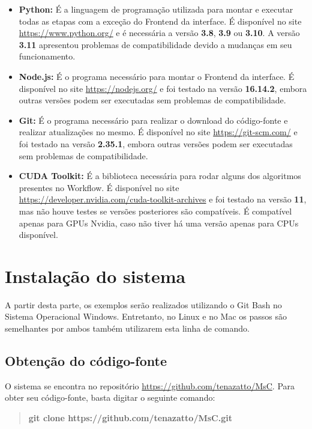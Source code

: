 \documentclass[portugues]{ic-tese}
\begin{document}
\begin{itemize}
    \item {\textbf{Python:}} É a linguagem de programação utilizada para montar e executar todas as etapas com a exceção do Frontend da interface. É disponível no site \url{https://www.python.org/} e é necessária a versão \textbf{3.8}, \textbf{3.9} ou \textbf{3.10}. A versão \textbf{3.11} apresentou problemas de compatibilidade devido a mudanças em seu funcionamento.
    \item {\textbf{Node.js:}} É o programa necessário para montar o Frontend da interface. É disponível no site \url{https://nodejs.org/} e foi testado na versão \textbf{16.14.2}, embora outras versões podem ser executadas sem problemas de compatibilidade.
    \item {\textbf{Git:}} É o programa necessário para realizar o download do código-fonte e realizar atualizações no mesmo. É disponível no site \url{https://git-scm.com/} e foi testado na versão \textbf{2.35.1}, embora outras versões podem ser executadas sem problemas de compatibilidade.
	\item {\textbf{CUDA Toolkit:}} É a biblioteca necessária para rodar alguns dos algoritmos presentes no Workflow. É disponível no site \url{https://developer.nvidia.com/cuda-toolkit-archives} e foi testado na versão \textbf{11}, mas não houve testes se versões posteriores são compatíveis. É compatível apenas para GPUs Nvidia, caso não tiver há uma versão apenas para CPUs disponível.
\end{itemize}

\section{Instalação do sistema}

A partir desta parte, os exemplos serão realizados utilizando o Git Bash no Sistema Operacional Windows. Entretanto, no Linux e no Mac os passos são semelhantes por ambos também utilizarem esta linha de comando.

\subsection{Obtenção do código-fonte}

O sistema se encontra no repositório \url{https://github.com/tenazatto/MsC}. Para obter seu código-fonte, basta digitar o seguinte comando:

\begin{quote}\textbf{git clone https://github.com/tenazatto/MsC.git}\end{quote}
\end{document}
